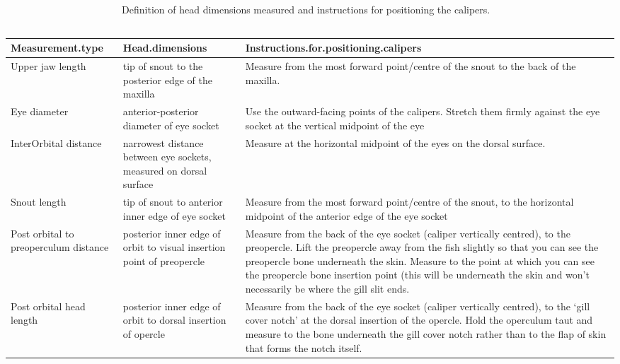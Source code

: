 \documentclass[12pt]{article}\usepackage[]{graphicx}\usepackage[]{color}
\begin{document}
\begin{table}

\caption{\label{tab:table1}Definition of head dimensions measured and instructions for positioning the calipers. ~\\
\hspace*{0.333em}\\}
\centering
\fontsize{8}{10}\selectfont
\begin{tabular}[t]{>{\raggedright\arraybackslash}p{2.2cm}>{\raggedright\arraybackslash}p{2.7cm}>{\raggedright\arraybackslash}p{4.7cm}}
\toprule
Measurement.type & Head.dimensions & Instructions.for.positioning.calipers\\
\midrule
Upper jaw length & tip of snout to the posterior edge of the maxilla & Measure from the most forward point/centre of the snout to the back of the maxilla.\\
\hline
Eye diameter & anterior-posterior diameter of eye socket & Use the outward-facing points of the calipers. Stretch them firmly against the eye socket at the vertical midpoint of the eye\\
\hline
InterOrbital distance & narrowest distance between eye sockets, measured on dorsal surface & Measure at the horizontal midpoint of the eyes on the dorsal surface.\\
\hline
Snout length & tip of snout to anterior inner edge of eye socket & Measure from the most forward point/centre of the snout, to the horizontal midpoint of the anterior edge of the eye socket\\
\hline
Post orbital to preoperculum distance & posterior inner edge of orbit to visual insertion point of preopercle & Measure from the back of the eye socket (caliper vertically centred), to the preopercle.  Lift the preopercle away from the fish slightly so that you can see the preopercle bone underneath the skin. Measure to the point at which you can see the preopercle bone insertion point (this will be underneath the skin and won’t necessarily be where the gill slit ends.\\
\hline
Post orbital head length & posterior inner edge of orbit to dorsal insertion of opercle & Measure from the back of the eye socket (caliper vertically centred), to the ‘gill cover notch’ at the dorsal insertion of the opercle.  Hold the operculum taut and measure to the bone underneath the gill cover notch rather than to the flap of skin that forms the notch itself.\\
\bottomrule
\end{tabular}
\end{table}
\end{document}
